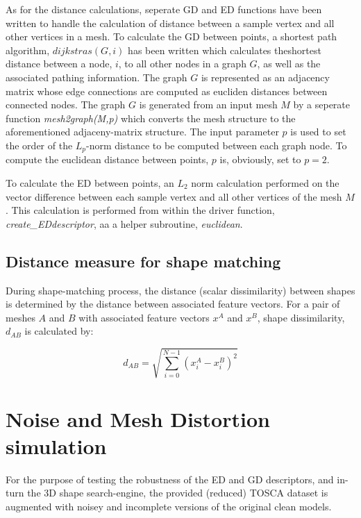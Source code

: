 \documentclass[12pt]{article}
\begin{document}
	\noindent
	As for the distance calculations, seperate GD and ED functions have been written to handle the calculation of distance between a sample vertex and all other vertices in a mesh. To calculate the GD between points, a shortest path algorithm, $dijkstras(G,i)$ has been written which calculates theshortest  distance between a node, $i$, to all other nodes in a graph $G$, as well as the associated pathing information. The graph $G$ is represented as an adjacency matrix whose edge connections are computed as eucliden distances between connected nodes. The graph $G$ is generated from an input mesh $M$ by a seperate function \emph{mesh2graph(M,p)} which converts the mesh structure to the aforementioned adjaceny-matrix structure. The input parameter $p$ is used to set the order of the $L_{p}$-norm distance to be computed between each graph node. To compute the euclidean distance between points, $p$ is, obviously, set to $p=2$.
	
	\noindent
	To calculate the ED between points, an $L_{2}$ norm calculation performed on the vector difference between each \ith sample vertex and all other vertices of the mesh $M$. This calculation is performed from within the driver function, \emph{create\_EDdescriptor}, aa a helper subroutine, \emph{euclidean}.


	\subsection*{Distance measure for shape matching}

		\noindent
		During shape-matching process, the distance (scalar dissimilarity) between shapes is determined by the distance between associated feature vectors. For a pair of meshes $A$ and $B$ with associated feature vectors $x^{A}$ and $x^{B}$, shape dissimilarity, $d_{AB}$ is calculated by:

		\begin{equation}
			d_{AB} = \sqrt{ \sum_{i=0}^{N-1} \left( x^{A}_{i} - x^{B}_{i} \right)^{2} }
			\label{eq::shape_distance}
		\end{equation} 



\section*{Noise and Mesh Distortion simulation}
	
	\noindent
	For the purpose of testing the robustness of the ED and GD descriptors, and in-turn the 3D shape search-engine, the provided (reduced) TOSCA dataset is augmented with noisey and incomplete versions of the original clean models.
\end{document}
